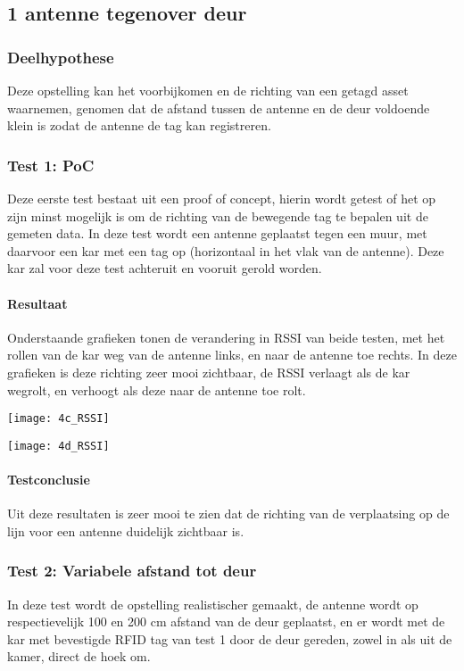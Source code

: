 \subsection{1 antenne tegenover deur}
\subsubsection{Deelhypothese}
Deze opstelling kan het voorbijkomen en de richting van een getagd asset waarnemen, genomen dat de afstand tussen de antenne en de deur voldoende klein is zodat de antenne de tag kan registreren.

\subsubsection{Test 1: PoC}
Deze eerste test bestaat uit een proof of concept, hierin wordt getest of het op zijn minst mogelijk is om de richting van de bewegende tag te bepalen uit de gemeten data. 
In deze test wordt een antenne geplaatst tegen een muur, met daarvoor een kar met een tag op (horizontaal in het vlak van de antenne). Deze kar zal voor deze test achteruit en vooruit gerold worden. 

\paragraph{Resultaat}
Onderstaande grafieken tonen de verandering in RSSI van beide testen, met het rollen van de kar weg van de antenne links, en naar de antenne toe rechts. In deze grafieken is deze richting zeer mooi zichtbaar, de RSSI verlaagt als de kar wegrolt, en verhoogt als deze naar de antenne toe rolt.

\begin{minipage}{0.42\textwidth}
	\texttt{[image: 4c\_RSSI]}
\end{minipage}
\hfill
\begin{minipage}{0.42\textwidth}
	\texttt{[image: 4d\_RSSI]}
\end{minipage}

\paragraph{Testconclusie}
Uit deze resultaten is zeer mooi te zien dat de richting van de verplaatsing op de lijn voor een antenne duidelijk zichtbaar is.

\subsubsection{Test 2: Variabele afstand tot deur}
In deze test wordt de opstelling realistischer gemaakt, de antenne wordt op respectievelijk 100 en 200 cm afstand van de deur geplaatst, en er wordt met de kar met bevestigde RFID tag van test 1 door de deur gereden, zowel in als uit de kamer, direct de hoek om. 

